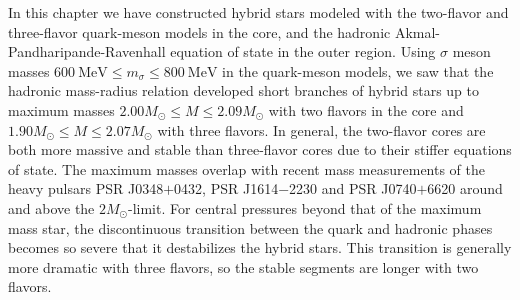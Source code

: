 In this chapter we have constructed hybrid stars modeled with the two-flavor and three-flavor quark-meson models in the core,
and the hadronic Akmal-Pandharipande-Ravenhall equation of state in the outer region.
Using $\sigma$ meson masses $\SI{600}{\mega\electronvolt} \leq m_\sigma \leq \SI{800}{\mega\electronvolt}$ in the quark-meson models,
we saw that the hadronic mass-radius relation developed short branches of hybrid stars
up to maximum masses $2.00 M_\odot \leq M \leq 2.09 M_\odot$ with two flavors in the core
and $1.90 M_\odot \leq M \leq 2.07 M_\odot$ with three flavors.
In general, the two-flavor cores are both more massive and stable than three-flavor cores
due to their stiffer equations of state.
The maximum masses overlap with recent mass measurements of the heavy pulsars PSR J0348$+$0432, PSR J1614$-$2230 and PSR J0740$+$6620 around and above the $2 M_\odot$-limit.
For central pressures beyond that of the maximum mass star,
the discontinuous transition between the quark and hadronic phases becomes so severe that it destabilizes the hybrid stars.
This transition is generally more dramatic with three flavors,
so the stable segments are longer with two flavors.
